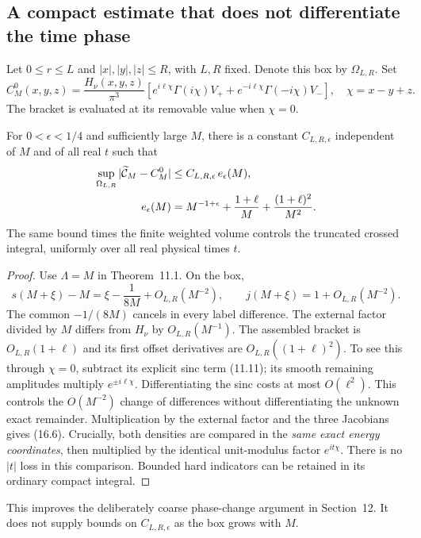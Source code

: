 \subsection{A compact estimate that does not differentiate the time phase}
Let $0\le r\le L$ and $|x|,|y|,|z|\le R$, with $L,R$ fixed.
Denote this box by $\Omega_{L,R}$. Set
\begin{equation}
 C^0_M(x,y,z)=\frac{H_\nu(x,y,z)}{\pi^3}
 \left[e^{i\ell\chi}\Gamma(i\chi)V_+
       +e^{-i\ell\chi}\Gamma(-i\chi)V_-\right],
 \quad \chi=x-y+z.
 \label{eq:tb-C0}
\end{equation}
The bracket is evaluated at its removable value when $\chi=0$.
\begin{lemma}
For $0<\epsilon<1/4$ and sufficiently large $M$, there is a constant
$C_{L,R,\epsilon}$ independent of $M$ and of all real $t$ such that
\begin{align}
 \sup_{\Omega_{L,R}}|\widetilde{\mathcal C}_M-C^0_M|
 &\le C_{L,R,\epsilon}\,e_\epsilon(M),\notag\\
 e_\epsilon(M)&=M^{-1+\epsilon}
       +\frac{1+\ell}{M}+\frac{(1+\ell)^2}{M^2}.
 \label{eq:tb-compact-error}
\end{align}
The same bound times the finite weighted volume controls the truncated
crossed integral, uniformly over all real physical times $t$.
\label{lem:tb-compact}
\end{lemma}
\begin{proof}
Use $\Lambda=M$ in Theorem~11.1. On the box,
\[
 s(M+\xi)-M=\xi-\frac{1}{8M}+O_{L,R}(M^{-2}),
 \qquad j(M+\xi)=1+O_{L,R}(M^{-2}).
\]
The common $-1/(8M)$ cancels in every label difference. The external
factor divided by $M$ differs from $H_\nu$ by $O_{L,R}(M^{-1})$.
The assembled bracket is $O_{L,R}(1+\ell)$ and its first offset
derivatives are $O_{L,R}((1+\ell)^2)$. To see this through $\chi=0$,
subtract its explicit sinc term (11.11); its smooth remaining
amplitudes multiply $e^{\pm i\ell\chi}$. Differentiating the sinc
costs at most $O(\ell^2)$. This controls the $O(M^{-2})$ change of
differences without differentiating the unknown exact remainder.
Multiplication by the external factor and the three Jacobians gives
(16.6). Crucially, both densities are compared in the \emph{same exact
energy coordinates}, then multiplied by the identical unit-modulus
factor $e^{it\chi}$. There is no $|t|$ loss in this comparison.
Bounded hard indicators can be retained in its ordinary compact integral.
\end{proof}
This improves the deliberately coarse phase-change argument in
Section~12. It does not supply bounds on $C_{L,R,\epsilon}$ as the box
grows with $M$.

